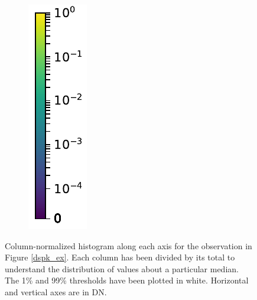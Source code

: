 \documentclass[10pt,letterpaper]{article}
\begin{document}
\begin{figure}[h!]
\begin{subfigure}[t]{0.079\textwidth}
						\includegraphics[width=\textwidth]{fig/cbar}
					\end{subfigure}
					
					\caption{Column-normalized histogram along each axis for the observation in Figure \ref{dspk_ex}.
						Each column has been divided by its total to understand the distribution of values about a particular median.
						The 1\% and 99\% thresholds have been plotted in white.
						Horizontal and vertical axes are in DN.}
					
					\label{dspk_hist}
					
				\end{figure}
		
\end{document}
